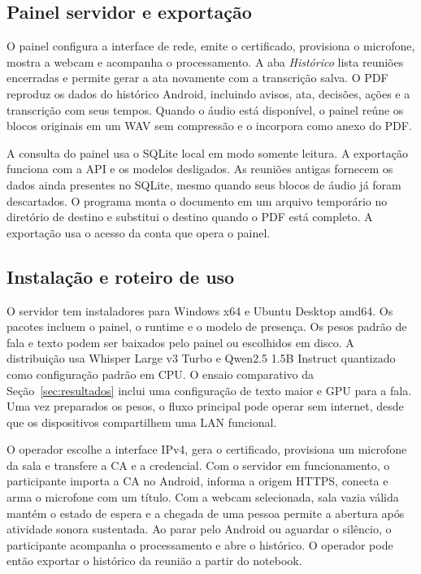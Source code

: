 \documentclass[12pt]{article}
\begin{document}
\subsection{Painel servidor e exportação}

O painel configura a interface de rede, emite o certificado, provisiona o microfone, mostra a webcam e acompanha o processamento. A aba \emph{Histórico} lista reuniões encerradas e permite gerar a ata novamente com a transcrição salva. O PDF reproduz os dados do histórico Android, incluindo avisos, ata, decisões, ações e a transcrição com seus tempos. Quando o áudio está disponível, o painel reúne os blocos originais em um WAV sem compressão e o incorpora como anexo do PDF.

A consulta do painel usa o SQLite local em modo somente leitura. A exportação funciona com a API e os modelos desligados. As reuniões antigas fornecem os dados ainda presentes no SQLite, mesmo quando seus blocos de áudio já foram descartados. O programa monta o documento em um arquivo temporário no diretório de destino e substitui o destino quando o PDF está completo. A exportação usa o acesso da conta que opera o painel.

\subsection{Instalação e roteiro de uso}

O servidor tem instaladores para Windows x64 e Ubuntu Desktop amd64. Os pacotes incluem o painel, o runtime e o modelo de presença. Os pesos padrão de fala e texto podem ser baixados pelo painel ou escolhidos em disco. A distribuição usa Whisper Large v3 Turbo e Qwen2.5 1.5B Instruct quantizado como configuração padrão em CPU. O ensaio comparativo da Seção~\ref{sec:resultados} inclui uma configuração de texto maior e GPU para a fala. Uma vez preparados os pesos, o fluxo principal pode operar sem internet, desde que os dispositivos compartilhem uma LAN funcional.

O operador escolhe a interface IPv4, gera o certificado, provisiona um microfone da sala e transfere a CA e a credencial. Com o servidor em funcionamento, o participante importa a CA no Android, informa a origem HTTPS, conecta e arma o microfone com um título. Com a webcam selecionada, sala vazia válida mantém o estado de espera e a chegada de uma pessoa permite a abertura após atividade sonora sustentada. Ao parar pelo Android ou aguardar o silêncio, o participante acompanha o processamento e abre o histórico. O operador pode então exportar o histórico da reunião a partir do notebook.
\end{document}
